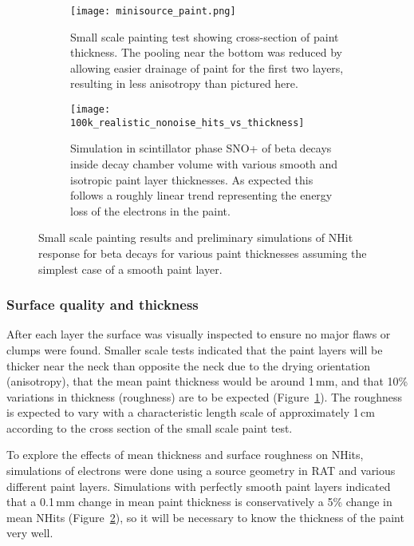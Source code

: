 \begin{figure}
\begin{subfigure}{.35\textwidth}
  \centering
  \texttt{[image: minisource\_paint.png]}
  \caption{Small scale painting test showing cross-section of paint thickness. The pooling near the bottom was reduced by allowing easier drainage of paint for the first two layers, resulting in less anisotropy than pictured here.}
  \label{fig:minisource_paint}
\end{subfigure}
\hspace{0.5cm}
\begin{subfigure}{.55\textwidth}
  \texttt{[image: 100k\_realistic\_nonoise\_hits\_vs\_thickness]}
  \caption{Simulation in scintillator phase SNO+ of \Li beta decays inside decay chamber volume with various smooth and isotropic paint layer thicknesses. As expected this follows a roughly linear trend representing the energy loss of the electrons in the paint.}
  \label{fig:meannhits}
\end{subfigure}
\caption{Small scale painting results and preliminary simulations of NHit response for \Li beta decays for various paint thicknesses assuming the simplest case of a smooth paint layer.}
\label{fig:prelimpaint}
\end{figure}

\subsubsection{Surface quality and thickness}
After each layer the surface was visually inspected to ensure no major flaws or clumps were found. Smaller scale tests indicated that the paint layers will be thicker near the neck than opposite the neck due to the drying orientation (anisotropy), that the mean paint thickness would be around 1\,mm, and that 10\% variations in thickness (roughness) are to be expected (Figure~\ref{fig:minisource_paint}). The roughness is expected to vary with a characteristic length scale of approximately 1\,cm according to the cross section of the small scale paint test.

To explore the effects of mean thickness and surface roughness on NHits, simulations of \Li electrons were done using a source geometry in RAT and various different paint layers. Simulations with perfectly smooth paint layers indicated that a 0.1\,mm change in mean paint thickness is conservatively a 5\% change in mean NHits (Figure~\ref{fig:meannhits}), so it will be necessary to know the thickness of the paint very well. 

